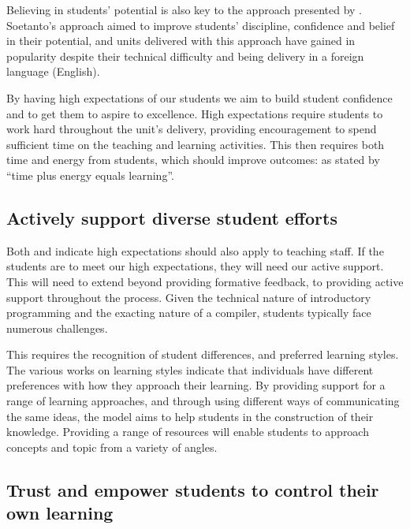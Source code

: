 Believing in students' potential is also key to the approach presented by \citet{Soetanto:2003,Soetanto:2012}. Soetanto's approach aimed to improve students' discipline, confidence and belief in their potential, and units delivered with this approach have gained in popularity despite their technical difficulty and being delivery in a foreign language (English). 

By having high expectations of our students we aim to build student confidence and to get them to aspire to excellence. High expectations require students to work hard throughout the unit's delivery, providing encouragement to spend sufficient time on the teaching and learning activities. This then requires both time and energy from students, which should improve outcomes: as stated by \citet{Chickering:1987} ``time plus energy equals learning''.


\subsection{Actively support diverse student efforts} %
\label{ssub:actively_support_student_efforts}

Both \citet{Chickering:1987} and \citet{Soetanto:2003,Soetanto:2012} indicate high expectations should also apply to teaching staff. If the students are to meet our high expectations, they will need our active support. This will need to extend beyond providing formative feedback, to providing active support throughout the process. Given the technical nature of introductory programming and the exacting nature of a compiler, students typically face numerous challenges.

This requires the recognition of student differences, and preferred learning styles. The various works on learning styles \cite{Coffield:2004} indicate that individuals have different preferences with how they approach their learning. By providing support for a range of learning approaches, and through using different ways of communicating the same ideas, the model aims to help students in the construction of their knowledge. Providing a range of resources will enable students to approach concepts and topic from a variety of angles.


\subsection{Trust and empower students to control their own learning} %
\label{ssub:trust_and_empower_students_to_control_their_own_learning}

